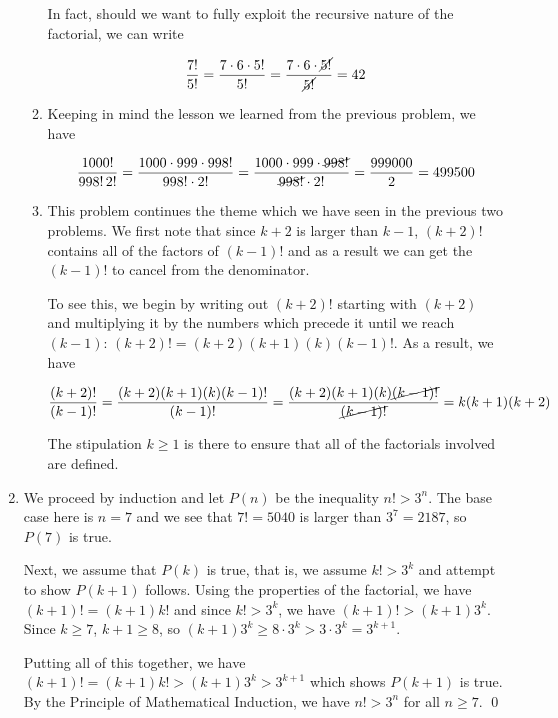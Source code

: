 \documentclass{ximera}
\begin{document}
\begin{ex}
\begin{enumerate}
\begin{enumerate}
In fact, should we want to fully exploit the recursive nature of the factorial, we can write

\[ \dfrac{7!}{5!} = \dfrac{7 \cdot 6 \cdot 5!}{5!} = \dfrac{7 \cdot 6 \cdot \cancel{5!}}{\cancel{5!}} = 42\]


\item  Keeping in mind the lesson we learned from the previous problem, we have

\[ \dfrac{1000!}{998! \, 2!} = \dfrac{1000 \cdot 999 \cdot 998!}{998! \cdot 2!} = \dfrac{1000 \cdot 999 \cdot \cancel{998!}}{\cancel{998!} \cdot 2!} = \dfrac{999000}{2} = 499500\]

\item  This problem continues the theme which we have seen in the previous two problems.  We first note that since $k+2$ is larger than $k-1$, $(k+2)!$ contains all of the factors of $(k-1)!$ and as a result we can get the $(k-1)!$ to cancel from the denominator.  

\smallskip

To see this,  we begin by writing out $(k+2)!$ starting with $(k+2)$ and multiplying it by the numbers which precede it until we reach $(k-1)$: $(k+2)! = (k+2)(k+1)(k)(k-1)!$.  As a result, we have

\[ \dfrac{(k+2)!}{(k-1)!} = \dfrac{(k+2)(k+1)(k)(k-1)!}{(k-1)!} = \dfrac{(k+2)(k+1)(k) \cancel{(k-1)!}}{\cancel{(k-1)!}} = k(k+1)(k+2)\]


The stipulation $k \geq 1$ is there to ensure that all of the factorials involved are defined.


\end{enumerate}

\item  We proceed by induction and let $P(n)$ be the inequality $n! > 3^n$.  The base case here is $n=7$ and we see that $7! = 5040$ is larger than $3^7 = 2187$, so $P(7)$ is true.  

\smallskip

Next, we assume that $P(k)$ is true, that is, we assume $k! > 3^k$ and attempt to show $P(k+1)$ follows. Using the properties of the factorial, we have $(k+1)! = (k+1) k!$ and since $k! > 3^k$, we have $(k+1)! > (k+1) 3^{k}$.  Since $k \geq 7$, $k+1 \geq 8$, so $(k+1) 3^{k} \geq 8 \cdot 3^{k} > 3 \cdot 3^{k} = 3^{k+1}$.  

\smallskip

Putting all of this together, we have $(k+1)! = (k+1) k! > (k+1)3^{k} > 3^{k+1}$ which shows $P(k+1)$ is true.  By the Principle of Mathematical Induction, we have $n! > 3^{n}$ for all $n \geq 7$. \qed

\end{enumerate}

\end{ex} 
\end{document}
